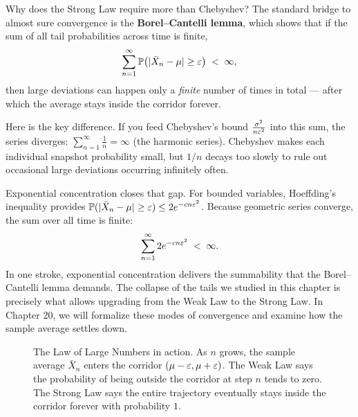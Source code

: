 Why does the Strong Law require more than Chebyshev? The standard bridge to
almost sure convergence is the \textbf{Borel--Cantelli lemma}, which shows
that if the sum of all tail probabilities across time is finite,
\[
  \sum_{n=1}^\infty \operatorname{\mathbb{P}}\bigl(\lvert\bar X_n - \mu\rvert \ge \varepsilon\bigr) \;<\; \infty,
\]
then large deviations can happen only a \emph{finite} number of times in total
--- after which the average stays inside the corridor forever.

Here is the key difference. If you feed Chebyshev's bound
$\frac{\sigma^2}{n\varepsilon^2}$ into this sum, the series diverges:
$\sum_{n=1}^\infty \frac{1}{n} = \infty$ (the harmonic series). Chebyshev makes
each individual snapshot probability small, but $1/n$ decays too slowly to rule
out occasional large deviations occurring infinitely often.

Exponential concentration closes that gap. For bounded
variables, Hoeffding's inequality provides
$\operatorname{\mathbb{P}}(\lvert\bar X_n - \mu\rvert \ge \varepsilon) \le 2e^{-c n\varepsilon^2}$. Because geometric
series converge, the sum over all time is finite:
\[
  \sum_{n=1}^\infty 2e^{-c n \varepsilon^2} \;<\; \infty.
\]
In one stroke, exponential concentration delivers the summability that the
Borel--Cantelli lemma demands. The collapse of the tails we studied in this
chapter is precisely what allows upgrading from the Weak Law to the Strong Law.
In Chapter 20, we will formalize these modes of convergence and examine how the
sample average settles down.

\begin{figure}[H]
\centering
{}
\caption{The Law of Large Numbers in action. As $n$ grows, the sample average $\bar X_n$ enters the corridor $(\mu-\varepsilon, \mu+\varepsilon)$. The Weak Law says the probability of being outside the corridor at step $n$ tends to zero. The Strong Law says the entire trajectory eventually stays inside the corridor forever with probability $1$.}
\label{ch19:fig-lln-trajectory}
\end{figure}

